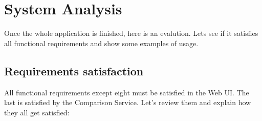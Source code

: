 
\chapter{System Analysis}

\label{chapter08}

Once the whole application is finished, here is an evalution. Lets see if it satisfies all functional requirements and show some examples of usage.

\section{Requirements satisfaction}

All functional requirements except eight must be satisfied in the Web UI. The last is satisfied by the Comparison Service. Let's review them and explain how they all get satisfied:

